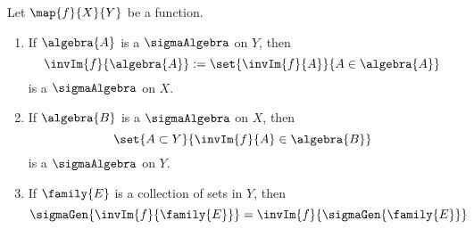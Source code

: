 \begin{Theorem}[name=Pre-Image $\sigmaAlgebra$]\label{thm:pre_img_sigma}
    Let $\map{f}{X}{Y}$ be a function.
    \begin{enumerate}
	\item
	    If $\algebra{A}$ is a $\sigmaAlgebra$ on $Y$, then
	    \begin{equation*}
		\invIm{f}{\algebra{A}} := \set{\invIm{f}{A}}{A \in \algebra{A}}
	    \end{equation*}
	    is a $\sigmaAlgebra$ on $X$.
	\item
	    If $\algebra{B}$ is a $\sigmaAlgebra$ on $X$, then
	    \begin{equation*}
		\set{A\subset Y}{\invIm{f}{A}\in\algebra{B}}
	    \end{equation*}
	    is a $\sigmaAlgebra$ on $Y$.
	\item
	    If $\family{E}$ is a collection of sets in $Y$, then
	    \begin{equation*}
		\sigmaGen{\invIm{f}{\family{E}}} = \invIm{f}{\sigmaGen{\family{E}}}
	    \end{equation*}
    \end{enumerate}
\end{Theorem}
